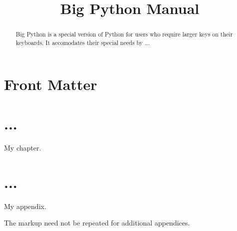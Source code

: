 \documentclass{manual}
\title{Big Python Manual}
\begin{document}
\maketitle

\ifhtml
\chapter*{Front Matter\label{front}}
\fi

%

\begin{abstract}

\noindent
Big Python is a special version of Python for users who require larger 
keys on their keyboards.  It accomodates their special needs by ...

\end{abstract}

\tableofcontents


\chapter{...}

My chapter.


\appendix
\chapter{...}

My appendix.

The  markup need not be repeated for additional
appendices.


%
%
%
\renewcommand{\indexname}{Module Index}

\renewcommand{\indexname}{Index}
\end{document}
